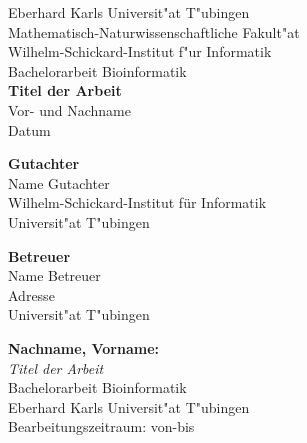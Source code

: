 \documentclass[twoside,12pt,a4paper]{report}
\begin{document}
 
\begin{titlepage}
 \begin{center}
  {\LARGE Eberhard Karls Universit"at T"ubingen}\\
  {\large Mathematisch-Naturwissenschaftliche Fakult"at \\
Wilhelm-Schickard-Institut f"ur Informatik\\[4cm]}
  {\huge Bachelorarbeit Bioinformatik\\[2cm]}
  {\Large\bf  Titel der Arbeit\\[1.5cm]}
 {\large Vor- und Nachname}\\[0.5cm]
Datum\\[3cm]
\begin{center}{\small\bf Gutachter}\\[0.5cm]
{\large Name Gutachter}\\
  {\footnotesize Wilhelm-Schickard-Institut f\"ur Informatik\\
  Universit"at T"ubingen} \end{center}
  
  
\begin{center}
{\small\bf Betreuer}\\[0.5cm]
{\large Name Betreuer}\\
  {\footnotesize Adresse\\
  Universit"at T"ubingen}\end{center}
  
  \end{center}
\end{titlepage}


\thispagestyle{empty}
\vspace*{\fill}
\begin{minipage}{11.2cm}
\textbf{Nachname, Vorname:}\\
\emph{Titel der Arbeit}\\ Bachelorarbeit Bioinformatik\\
Eberhard Karls Universit"at T"ubingen\\
Bearbeitungszeitraum: von-bis
\end{minipage}
\newpage
\end{document}
